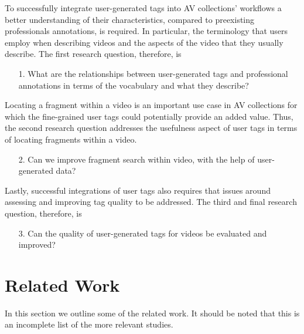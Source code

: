To successfully integrate user-generated tags into AV collections' workflows a better understanding of their characteristics, compared to preexisting professionals annotations, is required. In particular,  the terminology that users employ when describing videos  and the aspects of the video that they usually describe. The first research question, therefore, is
\begin{itemize}
	\item[1.] What are the relationships between user-generated tags  and professional annotations in terms of the vocabulary and what they describe?
\end{itemize}
Locating a fragment within a video is an important use case in AV collections for which the fine-grained user tags could potentially provide an added value. Thus, the second research question addresses the usefulness aspect of user tags in terms of locating fragments within a video.
\begin{itemize}
	\item[2.] Can we improve fragment search  within video, with the help of user-generated data?
\end{itemize}

Lastly, successful integrations of user tags also requires that issues around assessing and improving tag quality to be addressed. The third and final research question, therefore, is
\begin{itemize}
	\item[3.] Can the quality of user-generated tags for videos be evaluated and improved?
\end{itemize}

\section{Related Work}
In this section we outline some of the related work. It should be noted that this is an incomplete list of the more relevant studies.

